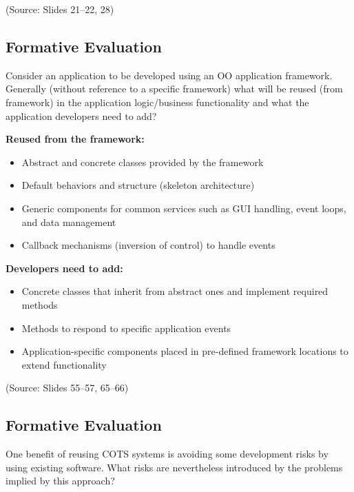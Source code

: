 \documentclass[12pt]{article}
\begin{document}
(Source: Slides 21--22, 28)

\subsection{Formative Evaluation}

\begin{questionbox}
Consider an application to be developed using an OO application framework. Generally (without reference to a specific framework) what will be reused (from framework) in the application logic/business functionality and what the application developers need to add?
\end{questionbox}

\textbf{Reused from the framework:}
\begin{itemize}
    \item Abstract and concrete classes provided by the framework
    \item Default behaviors and structure (skeleton architecture)
    \item Generic components for common services such as GUI handling, event loops, and data management
    \item Callback mechanisms (inversion of control) to handle events
\end{itemize}

\textbf{Developers need to add:}
\begin{itemize}
    \item Concrete classes that inherit from abstract ones and implement required methods
    \item Methods to respond to specific application events
    \item Application-specific components placed in pre-defined framework locations to extend functionality
\end{itemize}

(Source: Slides 55--57, 65--66)

\subsection{Formative Evaluation}

\begin{questionbox}
One benefit of reusing COTS systems is avoiding some development risks by using existing software. What risks are nevertheless introduced by the problems implied by this approach?
\end{questionbox}
\end{document}
